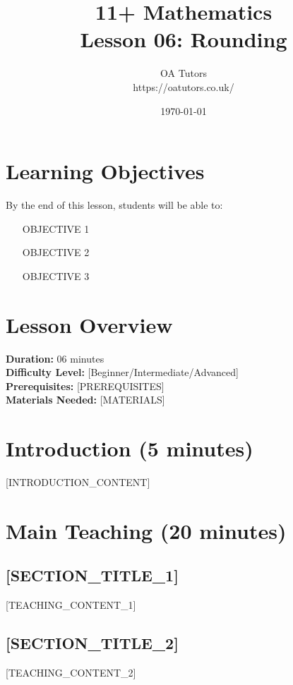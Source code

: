 \documentclass[a4paper,12pt]{article}
\begin{document}
\title{\textcolor{oablue}{\Huge 11+ Mathematics} \\ 
       \textcolor{oablue}{\Large Lesson 06: Rounding}}
\author{\textcolor{oablue}{OA Tutors} \\ 
        \textcolor{oagray}{https://oatutors.co.uk/}}
\date{\textcolor{oagray}{\today}}

\maketitle

\section{Learning Objectives}
\begin{objective}
By the end of this lesson, students will be able to:
\begin{itemize}
    \item [OBJECTIVE 1]
    \item [OBJECTIVE 2] 
    \item [OBJECTIVE 3]
\end{itemize}
\end{objective}

\section{Lesson Overview}
\textbf{Duration:} 06 minutes \\
\textbf{Difficulty Level:} [Beginner/Intermediate/Advanced] \\
\textbf{Prerequisites:} [PREREQUISITES] \\
\textbf{Materials Needed:} [MATERIALS]

\section{Introduction (5 minutes)}
[INTRODUCTION_CONTENT]

\section{Main Teaching (20 minutes)}
\subsection{[SECTION_TITLE_1]}
[TEACHING_CONTENT_1]

\subsection{[SECTION_TITLE_2]}
[TEACHING_CONTENT_2]
\end{document}
